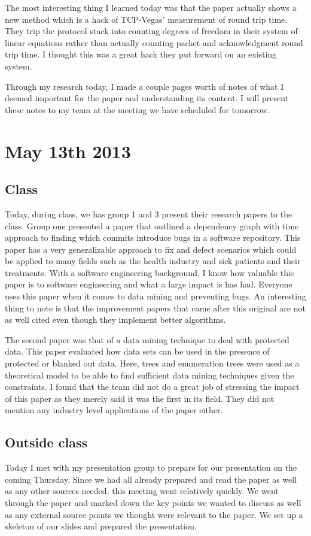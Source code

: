 \documentclass[conference]{IEEEtran}
\begin{document}
The most interesting thing I learned today was that the paper actually shows a new method
which is a hack of TCP-Vegas' measurement of round trip time. They trip the protocol
stack into counting degrees of freedom in their system of linear equations rather than
actually counting packet and acknowledgment round trip time. I thought this was a great
hack they put forward on an existing system.

Through my research today, I made a couple pages worth of notes of what I deemed important
for the paper and understanding its content. I will present these notes to my team at
the meeting we have scheduled for tomorrow.

\section{May 13th 2013}
\subsection{Class}
Today, during class, we has group 1 and 3 present their research papers to the class. 
Group one presented a paper that outlined a dependency graph with time approach to
finding which commits introduce bugs in a software repository. This paper has a very
generalizable approach to fix and defect scenarios which could be applied to many
fields such as the health industry and sick patients and their treatments. With a software
engineering background, I know how valuable this paper is to software engineering
and what a large impact is has had. Everyone uses this paper when it comes to data
mining and preventing bugs. An interesting thing to note is that the improvement papers
that came after this original are not as well cited even though they implement better
algorithms.

The second paper was that of a data mining technique to deal with protected data.
This paper evaluated how data sets can be used in the presence of protected or
blanked out data. Here, trees and enumeration trees were used as a theoretical
model to be able to find sufficient data mining techniques given the constraints.
I found that the team did not do a great job of stressing the impact of this paper
as they merely said it was the first in its field. They did not mention any
industry level applications of the paper either.

\subsection{Outside class}
Today I met with my presentation group to prepare for our presentation on the 
coming Thursday. Since we had all already prepared and read the paper as well as
any other sources needed, this meeting went relatively quickly. We went through the
paper and marked down the key points we wanted to discuss as well as any external
source points we thought were relevant to the paper. We set up a skeleton of our
slides and prepared the presentation. 
\end{document}

